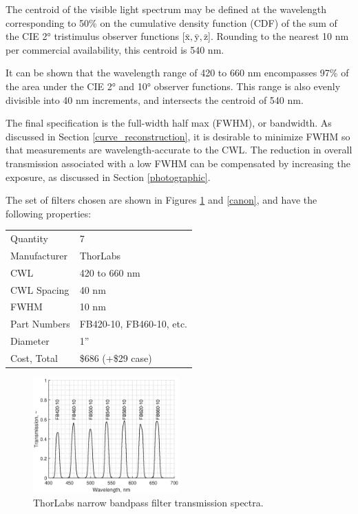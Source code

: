 \documentclass[twocolumn,10pt]{asme2ej}
\newcommand{\id}{\hspace{6 mm}}
\begin{document}
\id The centroid of the visible light spectrum may be defined at the wavelength corresponding to 50\% on the cumulative density function (CDF) of the sum of the CIE 2° tristimulus observer functions [$\mathrm{\bar{x}}, \mathrm{\bar{y}}, \mathrm{\bar{z}}$]. \cite{CVRL} Rounding to the nearest 10 nm per commercial availability, this centroid is 540 nm.

\id It can be shown that the wavelength range of 420 to 660 nm encompasses 97\% of the area under the CIE 2° and 10° observer functions. \cite{CVRL} This range is also evenly divisible into 40 nm increments, and intersects the centroid of 540 nm.

\id The final specification is the full-width half max (FWHM), or bandwidth. As discussed in Section \ref{curve_reconstruction}, it is desirable to minimize FWHM so that measurements are wavelength-accurate to the CWL. The reduction in overall transmission associated with a low FWHM can be compensated by increasing the exposure, as discussed in Section \ref{photographic}.

\id The set of filters chosen are shown in Figures \ref{thorlabs_filter_transmission_spectra} and \ref{canon}, and have the following properties:\\

\begin{tabular}{l | l}
Quantity & 7 \\
Manufacturer & ThorLabs \\
CWL & 420 to 660 nm \\
CWL Spacing & 40 nm \\
FWHM & 10 nm \\
Part Numbers & FB420-10, FB460-10, etc. \\
Diameter & 1'' \\
Cost, Total & \$686 (+\$29 case) \\
\end{tabular}

\begin{figure}
\centering
\includegraphics[width=0.5\textwidth]{thorlabs_filter_transmission_spectra.eps}
\caption{ThorLabs narrow bandpass filter transmission spectra.}
\label{thorlabs_filter_transmission_spectra}
\end{figure}
\end{document}
